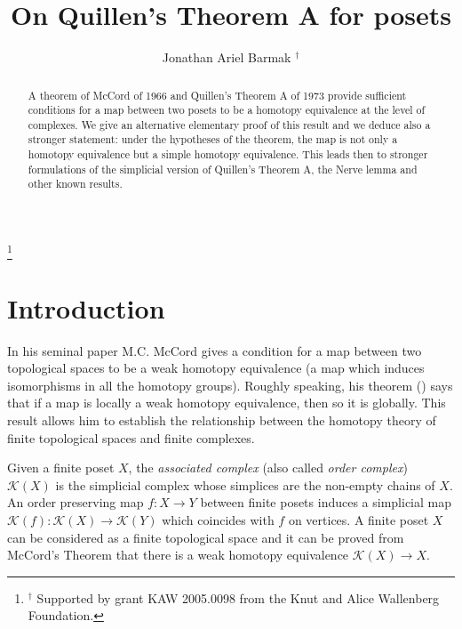 \documentclass[11pt,twoside]{amsart}
\theoremstyle{plain}
\theoremstyle{remark}
\theoremstyle{definition}
\newcommand{\kp}{\mathcal{K}}
\begin{document}
\title[On Quillen's Theorem A for posets]{On Quillen's Theorem A for posets}


\author[J.A. Barmak]{Jonathan Ariel Barmak $^{\dagger}$}

\thanks{$^{\dagger}$ Supported by grant KAW 2005.0098 from the Knut 
and Alice Wallenberg Foundation.}

\address{Mathematics Department\\
Kungliga Tekniska h\"ogskolan\\
 Stockholm, Sweden}


\begin{abstract}
A theorem of McCord of 1966 and Quillen's Theorem A of 1973 provide sufficient conditions for a map between two posets to be a homotopy equivalence at the level of complexes. We give an alternative elementary proof of this result and we deduce also a stronger statement: under the hypotheses of the theorem, the map is not only a homotopy equivalence but a simple homotopy equivalence. This leads then to stronger formulations of the simplicial version of Quillen's Theorem A, the Nerve lemma and other known results. 
\end{abstract}







\maketitle

\section{Introduction}

In his seminal paper \cite{Mcc} M.C. McCord gives a condition for a map between two topological spaces to be a weak homotopy equivalence (a map which induces isomorphisms in all the homotopy groups). Roughly speaking, his theorem (\cite[Theorem 6]{Mcc}) says that if a map is locally a weak homotopy equivalence, then so it is globally. This result allows him to establish the relationship between the homotopy theory of finite topological spaces and finite complexes.

Given a finite poset $X$, the \textit{associated complex} (also called \textit{order complex}) $\kp (X)$ is the simplicial complex whose simplices are the non-empty chains of $X$. An order preserving map $f: X\to Y$ between finite posets induces a simplicial map $\kp (f): \kp (X)\to \kp (Y)$ which coincides with $f$ on vertices. A finite poset $X$ can be considered as a finite topological space and it can be proved from McCord's Theorem that there is a weak homotopy equivalence $\kp (X) \to X$.
\end{document}
